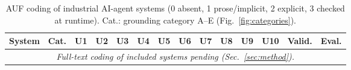 \begin{table}[t]
\centering\footnotesize
\setlength{\tabcolsep}{3pt}
\caption{AUF coding of industrial AI-agent systems (0 absent, 1 prose/implicit, 2 explicit, 3 checked at runtime). Cat.: grounding category A--E (Fig.~\ref{fig:categories}).}
\label{tab:agent-systems}
\begin{tabular}{@{}llcccccccccccc@{}}
\toprule
System & Cat. & U1 & U2 & U3 & U4 & U5 & U6 & U7 & U8 & U9 & U10 & Valid. & Eval. \\
\midrule
\multicolumn{14}{c}{\textit{Full-text coding of included systems pending (Sec.~\ref{sec:method}).}} \\
\bottomrule
\end{tabular}
\end{table}
